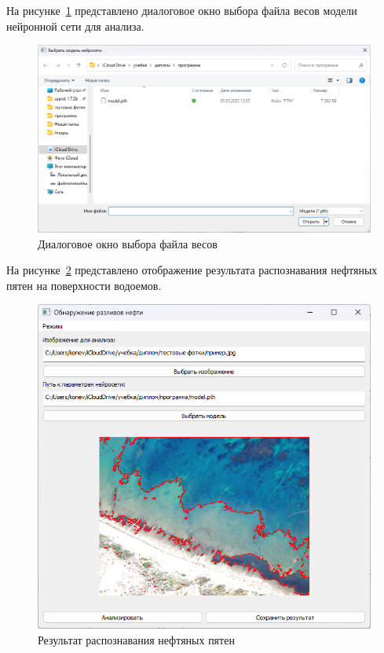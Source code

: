 На рисунке~\ref{fig:model_select_analyze} представлено диалоговое окно выбора файла весов модели нейронной сети для анализа.
\begin{figure}[H]
	\centering
	\includegraphics[width=0.7\linewidth]{"images/выбор модели анализ"}
	\caption{Диалоговое окно выбора файла весов}
	\label{fig:model_select_analyze}
\end{figure}

На рисунке~\ref{fig:analysis_result} представлено отображение результата распознавания нефтяных пятен на поверхности водоемов.
\begin{figure}[H]
	\centering
	\includegraphics[width=0.7\linewidth]{"images/результат анализа"}
	\caption{Результат распознавания нефтяных пятен}
	\label{fig:analysis_result}
\end{figure}


